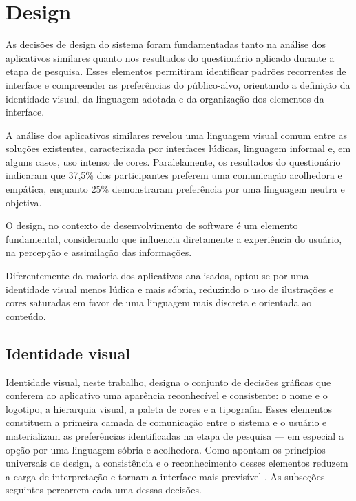 \chapter{Design}


As decisões de design do sistema foram fundamentadas tanto na análise dos
aplicativos similares quanto nos resultados do questionário aplicado durante a
etapa de pesquisa. Esses elementos permitiram identificar padrões recorrentes
de interface e compreender as preferências do público-alvo, orientando a
definição da identidade visual, da linguagem adotada e da organização dos
elementos da interface.

A análise dos aplicativos similares revelou uma linguagem visual comum entre as
soluções existentes, caracterizada por interfaces lúdicas, linguagem informal
e, em alguns casos, uso intenso de cores. Paralelamente, os resultados do
questionário indicaram que 37,5\% dos participantes preferem uma comunicação
acolhedora e empática, enquanto 25\% demonstraram preferência por uma linguagem
neutra e objetiva.

O design, no contexto de desenvolvimento de software é um elemento fundamental,
considerando que influencia diretamente a experiência do usuário, na percepção
e assimilação das informações.

Diferentemente da maioria dos aplicativos analisados, optou-se por uma
identidade visual menos lúdica e mais sóbria, reduzindo o uso de ilustrações e
cores saturadas em favor de uma linguagem mais discreta e orientada ao
conteúdo.

\section{Identidade visual}

Identidade visual, neste trabalho, designa o conjunto de decisões gráficas que
conferem ao aplicativo uma aparência reconhecível e consistente: o nome e o
logotipo, a hierarquia visual, a paleta de cores e a tipografia. Esses
elementos constituem a primeira camada de comunicação entre o sistema e o
usuário e materializam as preferências identificadas na etapa de pesquisa ---
em especial a opção por uma linguagem sóbria e acolhedora. Como apontam os
princípios universais de design, a consistência e o reconhecimento desses
elementos reduzem a carga de interpretação e tornam a interface mais previsível
\cite{Lidwell_2011}. As subseções seguintes percorrem cada uma dessas decisões.


